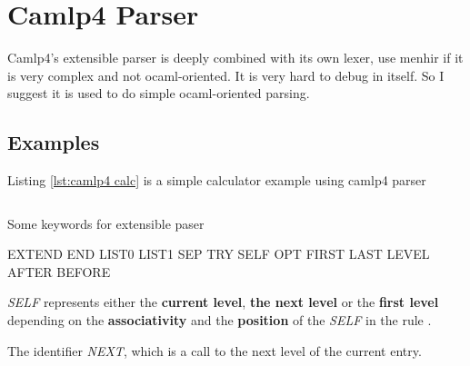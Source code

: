 \section{Camlp4 Parser}

Camlp4's extensible parser is deeply combined with its own lexer, use
menhir if it is very complex and not ocaml-oriented. It is very hard
to debug in itself. So I suggest it is used to do simple
ocaml-oriented parsing.

\subsection{Examples}
Listing \ref{lst:camlp4 calc} is a simple calculator example using
camlp4 parser


\inputminted[fontsize=\scriptsize]{ocaml}{code/camlp4/arith/simple_arith.ml}



Some keywords for extensible paser

\begin{ocamlcode}
  EXTEND END  LIST0 LIST1 SEP TRY SELF OPT  FIRST LAST  LEVEL AFTER BEFORE
\end{ocamlcode}


\textit{SELF} represents either the \textbf{current level},
\textbf{the next level} or the \textbf{ first level} depending on the
\textbf{ associativity} and the \textbf{position} of the \textit{SELF}
in the rule .

The identifier \textit{NEXT}, which is a call to the next level of the
current entry.

